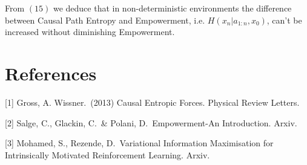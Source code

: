 \documentclass{article}
\begin{document}
From $(15)$ we deduce that in non-deterministic environments the difference between Causal Path Entropy and Empowerment, i.e. $H(x_n|a_{1:n},x_0)$, can't be increased without diminishing Empowerment. 

\section*{References}

\small

[1] Gross, A. Wissner.\ (2013) Causal Entropic Forces. Physical Review Letters.

[2] Salge, C., Glackin, C.\ \& Polani, D.\ Empowerment-An Introduction. Arxiv. 

[3] Mohamed, S., Rezende, D.\ Variational Information Maximisation for Intrinsically Motivated Reinforcement Learning. Arxiv. 
\end{document}
